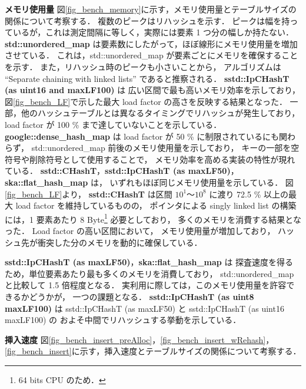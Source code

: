 %
{\bf メモリ使用量}
\samepage\newline\indent
図\ref{fig_bench_memory}に示す，メモリ使用量とテーブルサイズの関係について考察する．
複数のピークはリハッシュを示す．
ピークは幅を持っているが，これは測定間隔に等しく，実際には要素 1 つ分の幅しか持たない．
{\bf std::unordered\_map} は要素数にしたがって，ほぼ線形にメモリ使用量を増加させている．
これは，std::unordered\_map が要素ごとにメモリを確保することを示す．
また，リハッシュ時のピークも小さいことから，
アルゴリズムは ``Separate chaining with linked lists'' であると推察される．
{\bf sstd::IpCHashT (as uint16 and maxLF100)} は
広い区間で最も高いメモリ効率を示しており，
図\ref{fig_bench_LF}で示した最大 load factor の高さを反映する結果となった．
一部，他のハッシュテーブルとは異なるタイミングでリハッシュが発生しており，
load factor が 100 \% まで達していないことを示している．
{\bf google::dense\_hash\_map} は
load factor が 50 \% に制限されているにも関わらず，
std::unordered\_map 前後のメモリ使用量を示しており，
キーの一部を空符号や削除符号として使用することで，
メモリ効率を高める実装の特性が現れている．
{\bf sstd::CHashT}，{\bf sstd::IpCHashT (as maxLF50)}，{\bf ska::flat\_hash\_map} は，
いずれもほぼ同じメモリ使用量を示している．
図\ref{fig_bench_LF}より，
{\bf sstd::CHashT} は区間 $10^1〜10^8$ に渡り 72.5 \% 以上の最大 load factor を維持しているものの，
ポインタによる singly linked list の構築には，1 要素あたり 8 Byte\footnote{64 bits CPU のため．} 必要としており，
多くのメモリを消費する結果となった．
Load factor の高い区間において，
メモリ使用量が増加しており，
ハッシュ先が衝突した分のメモリを動的に確保している．

\noindent
{\bf sstd::IpCHashT (as maxLF50)}，{\bf ska::flat\_hash\_map} は
探査速度を得るため，単位要素あたり最も多くのメモリを消費しており，
std::unordered\_map と比較して 1.5 倍程度となる．
実利用に際しては，このメモリ使用量を許容できるかどうかが，
一つの課題となる．
{\bf sstd::IpCHashT (as uint8 maxLF100)} は
sstd::IpCHashT (as maxLF50) と sstd::IpCHashT (as uint16 maxLF100) の
およそ中間でリハッシュする挙動を示している．
\leavevmode \newline

%
{\bf 挿入速度}
\samepage\newline\indent
図\ref{fig_bench_insert_preAlloc}，\ref{fig_bench_insert_wRehash}，\ref{fig_bench_insert}に示す，挿入速度とテーブルサイズの関係について考察する．

